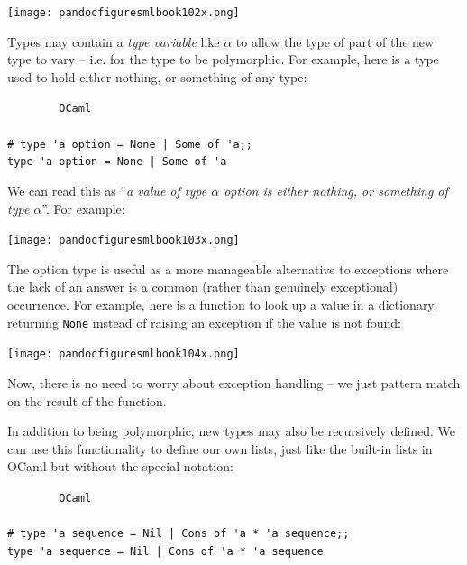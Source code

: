 \documentclass[]{book}
\newcommand{\smspace}{\vspace{4mm}}
\begin{document}
\medskip
\begin{center}
\noindent\texttt{[image: pandocfiguresmlbook102x.png]}
\end{center}
\medskip

\noindent Types may contain a \textit{type variable} like $\alpha$ to allow the type of part of the new type to vary -- i.e. for the type to be polymorphic. For example, here is a type used to hold either nothing, or something of any type:

\smspace
\noindent\verb!        OCaml!\\
\noindent\\
\noindent\verb!# type 'a option = None | Some of 'a;;!\\
\noindent\verb!type 'a option = None | Some of 'a!
\smspace

\noindent We can read this as ``\textit{a value of type $\alpha$ \textsf{option} is either nothing, or something of type $\alpha$}''. For example:

\medskip
\begin{center}
\noindent\texttt{[image: pandocfiguresmlbook103x.png]}
\end{center}
\medskip

\noindent The \textsf{option} type is useful as a more manageable alternative to exceptions where the lack of an answer is a common (rather than genuinely exceptional) occurrence. For example, here is a function to look up a value in a dictionary, returning \texttt{None} instead of raising an exception if the value is not found:

\medskip
\begin{center}
\noindent\texttt{[image: pandocfiguresmlbook104x.png]}
\end{center}
\medskip

\noindent Now, there is no need to worry about exception handling -- we just pattern match on the result of the function.

In addition to being polymorphic, new types may also be recursively defined. We can use this functionality to define our own lists, just like the built-in lists in OCaml but without the special notation:

\smspace
\noindent\verb!        OCaml!\\
\noindent\\
\noindent\verb!# type 'a sequence = Nil | Cons of 'a * 'a sequence;;!\\
\noindent\verb!type 'a sequence = Nil | Cons of 'a * 'a sequence!
\smspace
\end{document}
